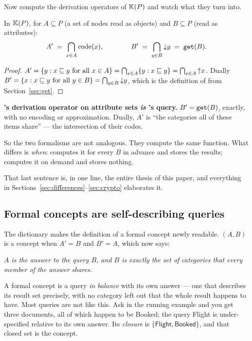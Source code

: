 Now compute the derivation operators of $\mathbb{K}(P)$ and watch what they turn
into.

\begin{proposition}
\label{prop:dictionary}
In $\mathbb{K}(P)$, for $A \subseteq P$ (a set of nodes read as objects) and
$B \subseteq P$ (read as attributes):
\[
  A' \;=\; \bigcap_{x \in A} \mathrm{code}(x),
  \qquad\qquad
  B' \;=\; \bigcap_{y \in B} \mathord{\downarrow}y \;=\; \texttt{get}(B) .
\]
\end{proposition}

\begin{proof}
$A' = \{y : x \sqsubseteq y \text{ for all } x \in A\} = \bigcap_{x\in A}\{y : x
\sqsubseteq y\} = \bigcap_{x \in A}\mathord{\uparrow}x$. Dually $B' = \{x : x \sqsubseteq y \text{ for
all } y \in B\} = \bigcap_{y \in B}\mathord{\downarrow}y$, which is the definition of
 from Section~\ref{sec:get}.
\end{proof}

\begin{keyidea}
\textbf{\fca{}'s derivation operator on attribute sets \emph{is} \odag{}'s
query.} $B' = \texttt{get}(B)$, exactly, with no encoding or approximation.
Dually, $A'$ is ``the categories all of these items share'' --- the
intersection of their codes.

So the two formalisms are not analogous. They compute the same function. What
differs is \emph{when}: \fca{} computes it for every $B$ in advance and stores
the results; \odag{} computes it on demand and stores nothing.
\end{keyidea}

That last sentence is, in one line, the entire thesis of this paper, and
everything in Sections~\ref{sec:differences}--\ref{sec:crypto} elaborates it.

\subsection{Formal concepts are self-describing queries}

The dictionary makes the definition of a formal concept newly readable.
$(A,B)$ is a concept when $A' = B$ and $B' = A$, which now says:

\begin{center}
\emph{$A$ is the answer to the query $B$, and $B$ is exactly the set of
categories that every member of the answer shares.}
\end{center}

A formal concept is a query \emph{in balance} with its own answer --- one
that describes its result set precisely, with no category left out that the
whole result happens to have. Most queries are not like this. Ask
 in the running example and you get three documents, all of
which happen to be \textsf{Booked}; the query \textsf{Flight} is
under-specified relative to its own answer. Its \emph{closure} is
$\{\textsf{Flight}, \textsf{Booked}\}$, and that closed set is the concept.

